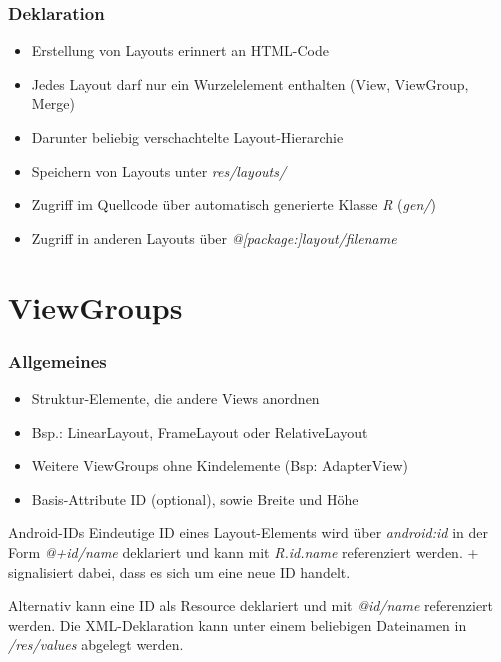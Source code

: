 \begin{frame}
   \frametitle{Deklaration}
   \begin{itemize}
      \item Erstellung von Layouts erinnert an HTML-Code
      \item Jedes Layout darf nur ein Wurzelelement enthalten 
         (View, ViewGroup, Merge)
      \item Darunter beliebig verschachtelte Layout-Hierarchie
      \item Speichern von Layouts unter \emph{res/layouts/}
      \item Zugriff im Quellcode über automatisch generierte Klasse \emph{R} (\emph{gen/})
      \item Zugriff in anderen Layouts über \emph{@[package:]layout/filename}
   \end{itemize}
\end{frame}

\section{ViewGroups}
\begin{frame}
   \frametitle{Allgemeines}
   \begin{itemize}
      \item Struktur-Elemente, die andere Views anordnen
      \item Bsp.: LinearLayout, FrameLayout oder RelativeLayout
      \item Weitere ViewGroups ohne Kindelemente (Bsp: AdapterView)
      \item Basis-Attribute ID (optional), sowie Breite und Höhe
   \end{itemize}

   \begin{alertblock}{Android-IDs}
      Eindeutige ID eines Layout-Elements wird über \emph{android:id} 
      in der Form \emph{@+id/name} deklariert und kann mit \emph{R.id.name} 
      referenziert werden. + signalisiert dabei, dass es sich 
      um eine neue ID handelt.
      
      \vspace{3mm}

      Alternativ kann eine ID als Resource deklariert und mit \emph{@id/name} 
      referenziert werden. Die XML-Deklaration kann unter einem beliebigen 
      Dateinamen in \emph{/res/values} abgelegt werden.\\

      
   \end{alertblock}
\end{frame}


